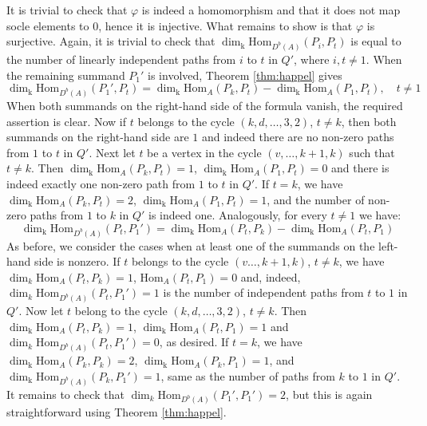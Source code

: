 \documentclass[12pt]{amsart}
\theoremstyle{plain}
\theoremstyle{remark}
\theoremstyle{definition}
\newcommand{\Hom}{{\mathrm{Hom}}}
\def\kk{\mathrm{k}}
\begin{document}
\begin{enumerate}
 It is trivial to check that $\varphi$ is indeed a homomorphism and that it does not map socle elements to $0$, hence it is injective. What remains to show is that $\varphi$ is surjective. Again, it is trivial to check that $\dim_\kk\Hom_{D^b(A)}(P_i,P_t)$ is equal to the number of linearly independent paths from $i$ to $t$ in $Q'$, where $i,t\neq 1$. When the remaining summand $P_1'$ is involved, Theorem \ref{thm:happel} gives
 $$\dim_\kk \Hom_{D^b(A)} (P_1', P_t) = \dim_\kk \Hom_{A} (P_k, P_t) - \dim_\kk \Hom_{A}(P_1,P_t), \quad t \neq 1 $$
 When both summands on the right-hand side of the formula vanish, the required assertion is clear. Now if $t$ belongs to the cycle $(k,d,\dots,3,2)$, $t \neq k$, then both summands on the right-hand side are $1$ and indeed there are no non-zero paths from $1$ to $t$ in $Q'$. Next let $t$ be a vertex in the cycle $(v, \dots, k+1,k)$ such that $t \neq k$. Then $\dim_\kk \Hom_{A}(P_k, P_t) = 1$, $\dim_\kk \Hom_{A}(P_1,P_t) = 0$ and there is indeed exactly one non-zero path from $1$ to $t$ in $Q'$. If $t = k$, we have $\dim_\kk \Hom_{A} (P_k, P_t) = 2$, $\dim_\kk \Hom_{A}(P_1,P_t) = 1$, and the number of non-zero paths from $1$ to $k$ in $Q'$ is indeed one. Analogously, for every $t \neq 1$ we have:
 $$\dim_\kk \Hom_{D^b(A)} (P_t, P_1') = \dim_\kk \Hom_{A} (P_t, P_k) - \dim_\kk \Hom_{A}(P_t,P_1)$$
 As before, we consider the cases when at least one of the summands on the left-hand side is nonzero. If $t$ belongs to the cycle $( v \dots, k+1, k)$, $t \neq k$, we have $\dim_k \Hom_{A}(P_t,P_k) = 1$, $\Hom_{A}(P_t,P_1) = 0$ and, indeed, $\dim_k \Hom_{D^b(A)} (P_t, P_1') = 1$ is the number of independent paths from $t$ to $1$ in $Q'$. Now let $t$ belong to the cycle $(k,d,\dots,3,2)$, $t \neq k$. Then ${\dim_\kk \Hom_{A}(P_t,P_k) = 1}$, ${\dim_\kk \Hom_{A}(P_t,P_1) = 1}$ and ${\dim_k \Hom_{D^b(A)} (P_t, P_1') = 0}$, as desired. If $t = k$, we have $\dim_\kk \Hom_{A}(P_k,P_k) = 2$, $\dim_\kk\Hom_{A}(P_k,P_1) = 1$, and $\dim_\kk \Hom_{D^b(A)} (P_k, P_1') = 1$, same as the number of paths from $k$ to $1$ in $Q'$. It remains to check that $\dim_k \Hom_{D^b(A)} (P_1', P_1') = 2$, but this is again straightforward using Theorem \ref{thm:happel}.  


\end{enumerate}
\end{document}
